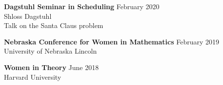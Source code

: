 \documentclass[12 pt]{article}
\newcommand{\lineunder}{\vspace*{-8pt} \\ \hspace*{-18pt} \hrulefill \\}
\newcommand{\header}[1]{{\hspace*{-15pt}\vspace*{6pt} \selectfont{\textsc{#1}}} \vspace*{-6pt} \lineunder}
\newcommand{\employer}[3]{{ \textbf{#1} \hfill #2 \\ #3\\  }}
\newenvironment{achievements}{\begin{list}{$\bullet$}{\topsep 0pt \itemsep -2pt}}{\vspace*{4pt}\end{list}}
\begin{document}
\bigskip
\employer{Dagstuhl Seminar in Scheduling}{February 2020}{Shloss Dagstuhl}
Talk on the Santa Claus problem


\bigskip
\employer{Nebraska Conference for Women in Mathematics}{February 2019}{University of Nebraska Lincoln}



\bigskip
\employer{Women in Theory}{June 2018}{Harvard University}











\end{document}
